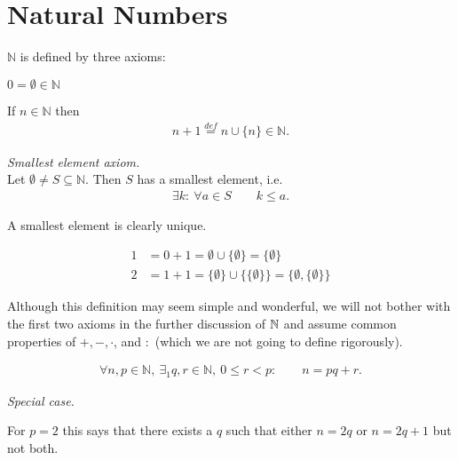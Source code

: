 \section{Natural Numbers}
$\mathbb N$ is defined by three axioms:
\begin{ax}
	$ 0 = \emptyset \in \mathbb N$ 
\end{ax}
\begin{ax}
	If $n \in \mathbb N$ then 
	\begin{align*}
	n+1 \overset{def} = n \cup \{n\} \in \mathbb N.
	\end{align*}
\end{ax}
\begin{ax} \emph{Smallest element axiom.} \\
Let $\emptyset \neq S \subseteq \mathbb N$. Then $S$ has a smallest element, i.e.
\begin{align*}
\exists k: ~\forall a \in S \qquad k \le a.
\end{align*}
\end{ax}

\begin{rk}
	A smallest element is clearly unique.
\end{rk}

\begin{ex}
	\begin{align*}
	1 & = 0+1 = \emptyset \cup \{ \emptyset \} = \{ \emptyset \} \\
	2 & = 1+1 = \{ \emptyset \} \cup \{ \{ \emptyset \} \} = \{ \emptyset, \{ \emptyset \} \} 
	\end{align*}
\end{ex}

\begin{rk}
	Although this definition may seem simple and wonderful, we will not bother with the first two axioms in the further discussion of $\mathbb N$ and assume common properties of $+, -, \cdot$, and $:$ (which we are not going to define rigorously).
\end{rk}


\begin{tm}
\begin{align*}
\forall n,p \in \mathbb N,~ \exists_1 q,r \in \mathbb N, ~0\leq r <p: \qquad n=pq+r.
\end{align*}
\end{tm}

\emph{Special case.}

For $p=2$ this says that there exists a $q$ such that either $n=2q$ or $n=2q+1$ but not both.


